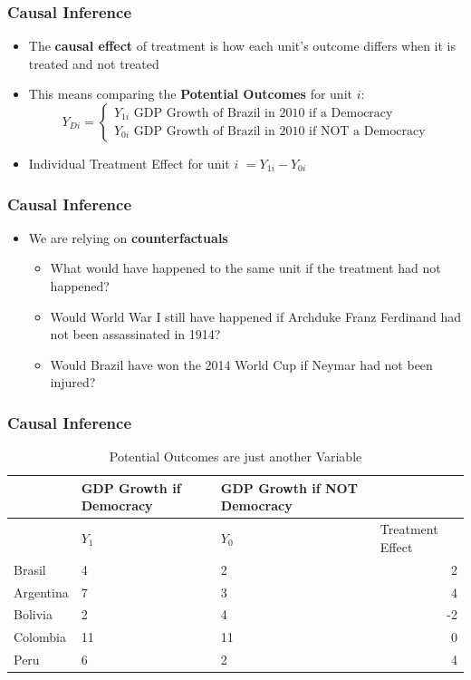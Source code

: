 \documentclass[xcolor=x11names,compress]{beamer}\usepackage[]{graphicx}\usepackage[]{color}
\renewcommand{\(}{\begin{columns}}
\renewcommand{\)}{\end{columns}}
\newcommand{\<}[1]{\begin{column}{#1}}
\renewcommand{\>}{\end{column}}
\begin{document}
\begin{frame}
\frametitle{Causal Inference}
\begin{itemize}
\item The \textbf{causal effect} of treatment is how each unit's outcome differs when it is treated and not treated
\pause
\item This means comparing the \textbf{Potential Outcomes} for unit $i$:
\[
Y_{Di} = 
\begin{cases}
Y_{1i}\text{   GDP Growth of Brazil in 2010 if a Democracy} \\
Y_{0i}\text{   GDP Growth of Brazil in 2010 if NOT a Democracy}
\end{cases}
\]
\item Individual Treatment Effect for unit $i$ $ = Y_{1i} - Y_{0i}$
\end{itemize}
\end{frame}

\begin{frame}
\frametitle{Causal Inference}
\begin{itemize}
\item We are relying on \textbf{counterfactuals}
\pause
\begin{itemize}
\item What would have happened to the same unit if the treatment had not happened?
\pause
\item Would World War I still have happened if Archduke Franz Ferdinand had not been assassinated in 1914?
\pause
\item Would Brazil have won the 2014 World Cup if Neymar had not been injured?
\pause
\end{itemize}
\end{itemize}
\end{frame}


\begin{frame}
\frametitle{Causal Inference}
\footnotesize
\begin{table}[htbp]
  \centering
  \caption{Potential Outcomes are just another Variable}
    \begin{tabular}{|p{2.4cm}|p{2.4cm}|p{2.4cm}|r|}
    \hline
          & \multicolumn{1}{p{2.4cm}|}{GDP Growth if Democracy} & \multicolumn{1}{p{2.4cm}|}{GDP Growth if  NOT Democracy} &  \bigstrut\\
    \hline
          & \multicolumn{1}{l|}{$Y_1$} & \multicolumn{1}{l|}{$Y_0$} & \multicolumn{1}{l|}{Treatment Effect} \bigstrut\\
    \hline
    Brasil & 4     & 2     & 2 \bigstrut\\
    \hline
    Argentina & 7    & 3     & 4 \bigstrut\\
    \hline
    Bolivia & 2     & 4     & -2 \bigstrut\\
    \hline
    Colombia & 11    & 11    & 0 \bigstrut\\
    \hline
    Peru & 6     & 2     & 4 \bigstrut\\
    \hline
    \end{tabular}%
  \label{tab:addlabel}%
\end{table}%
\normalsize
\end{frame}
\end{document}

